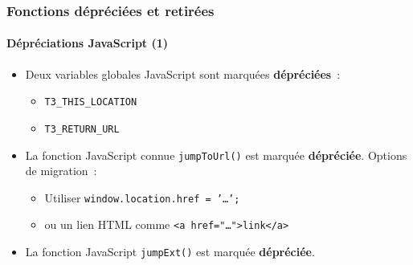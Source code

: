 \begin{frame}[fragile]
	\frametitle{Fonctions dépréciées et retirées}
	\framesubtitle{Dépréciations JavaScript (1)}

	\begin{itemize}
		\item Deux variables globales JavaScript sont marquées \textbf{dépréciées}~:

			\begin{itemize}
				\item \texttt{T3\_THIS\_LOCATION}
				\item \texttt{T3\_RETURN\_URL}
			\end{itemize}

		\item La fonction JavaScript connue \texttt{jumpToUrl()} est marquée \textbf{dépréciée}.
			Options de migration~:

			\begin{itemize}
				\item Utiliser \texttt{window.location.href = '\ldots';}
				\item ou un lien HTML comme \texttt{<a href="\ldots">link</a>}
			\end{itemize}

		\item La fonction JavaScript \texttt{jumpExt()} est marquée \textbf{dépréciée}.

	\end{itemize}

\end{frame}


